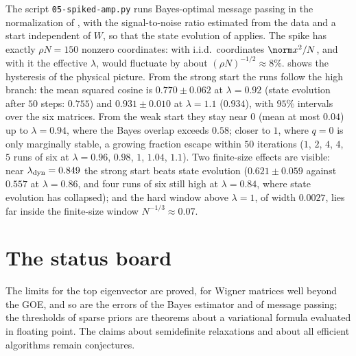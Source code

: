 \begin{refsection}
The script \texttt{05-spiked-amp.py} runs Bayes-optimal message passing in the normalization of \textcite{MontanariVenkataramanan2021}, with the signal-to-noise ratio estimated from the data and a start independent of $W$, so that the state evolution of \textcite{BayatiMontanari2011} applies. The spike has exactly $\rho N=150$ nonzero coordinates: with i.i.d.\ coordinates $\norm x^2/N$, and with it the effective $\lambda$, would fluctuate by about $(\rho N)^{-1/2}\approx8\%$.  shows the hysteresis of the physical picture. From the strong start the runs follow the high branch: the mean squared cosine is $0.770\pm0.062$ at $\lambda=0.92$ (state evolution after $50$ steps: $0.755$) and $0.931\pm0.010$ at $\lambda=1.1$ ($0.934$), with $95\%$ intervals over the six matrices. From the weak start they stay near $0$ (mean at most $0.04$) up to $\lambda=0.94$, where the Bayes overlap exceeds $0.58$; closer to $1$, where $q=0$ is only marginally stable, a growing fraction escape within $50$ iterations ($1$, $2$, $4$, $4$, $5$ runs of six at $\lambda=0.96$, $0.98$, $1$, $1.04$, $1.1$). Two finite-size effects are visible: near $\lambda_{\mathrm{dyn}}=0.849$ the strong start beats state evolution ($0.621\pm0.059$ against $0.557$ at $\lambda=0.86$, and four runs of six still high at $\lambda=0.84$, where state evolution has collapsed); and the hard window above $\lambda=1$, of width $0.0027$, lies far inside the finite-size window $N^{-1/3}\approx0.07$.

\section{The status board}\label{sec:spiked:status}

The limits for the top eigenvector are proved, for Wigner matrices well beyond the GOE, and so are the errors of the Bayes estimator and of message passing; the thresholds of sparse priors are theorems about a variational formula evaluated in floating point. The claims about semidefinite relaxations and about all efficient algorithms remain conjectures.


\end{refsection}
